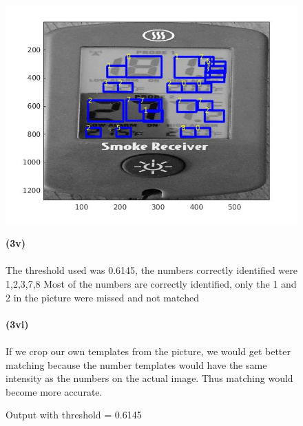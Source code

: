 \documentclass[]{article}
\begin{document}
    \begin{figure}[h!]
     \includegraphics[width=1.32\textwidth]{img/output06145.jpg}
     \caption{Output with threshold = 0.6145}
    \pagebreak
    \textbf{(3v)}
     \\\\ The threshold used was 0.6145, the numbers correctly identified were 1,2,3,7,8
    Most of the numbers are correctly identified, only the 1 and 2 in the picture were missed and not matched \\\\
    \pagebreak
    \textbf{(3vi)}
    \\\\ If we crop our own templates from the picture, we would get better matching because the number templates would have the same intensity as the numbers on the actual image. Thus matching would become more accurate.
    \end{figure}
\end{document}
